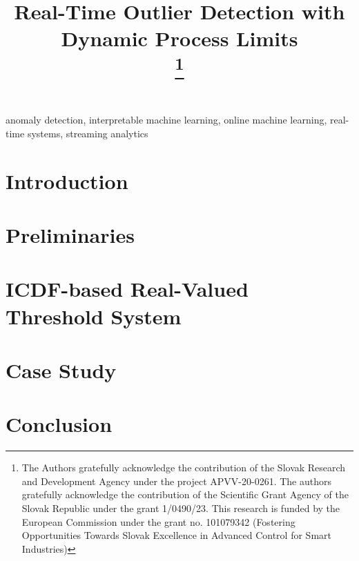 \documentclass[conference]{IEEEtran}
\begin{document}
\title{Real-Time Outlier Detection with Dynamic Process Limits\\

\thanks{The Authors gratefully acknowledge the contribution of the Slovak Research and Development Agency under the project APVV-20-0261. The authors gratefully acknowledge the contribution of the Scientific Grant Agency of the Slovak Republic under the grant 1/0490/23. This research is funded by the European Commission under the grant no. 101079342 (Fostering Opportunities Towards Slovak Excellence in Advanced Control for Smart Industries)}
}

\author{
\and
{}
}

\maketitle

\begin{abstract}

\end{abstract}

\begin{IEEEkeywords}
anomaly detection, interpretable machine learning, online machine learning, real-time systems, streaming analytics
\end{IEEEkeywords}

\section{Introduction}\label{Introduction}


\section{Preliminaries}


\section{ICDF-based Real-Valued Threshold System}


\section{Case Study}


\section{Conclusion}




\end{document}

